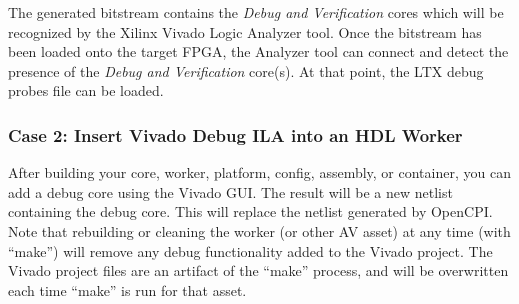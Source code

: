 \begin{flushleft}
		The generated bitstream contains the \textit{Debug and Verification} cores which will be recognized by the Xilinx Vivado Logic Analyzer tool. Once the bitstream has been loaded onto the target FPGA, the Analyzer tool can connect and detect the presence of the \textit{Debug and Verification} core(s). At that point, the LTX debug probes file can be loaded.

	\subsubsection{Case 2: Insert Vivado Debug ILA into an HDL Worker}
	After building your core, worker, platform, config, assembly, or container, you can add a debug core using the Vivado GUI. The result will be a new netlist containing the debug core. This will replace the netlist generated by OpenCPI. Note that rebuilding or cleaning the worker (or other AV asset) at any time (with ``make'') will remove any debug functionality added to the Vivado project. The Vivado project files are an artifact of the ``make'' process, and will be overwritten each time ``make'' is run for that asset.\newline


\end{flushleft}

